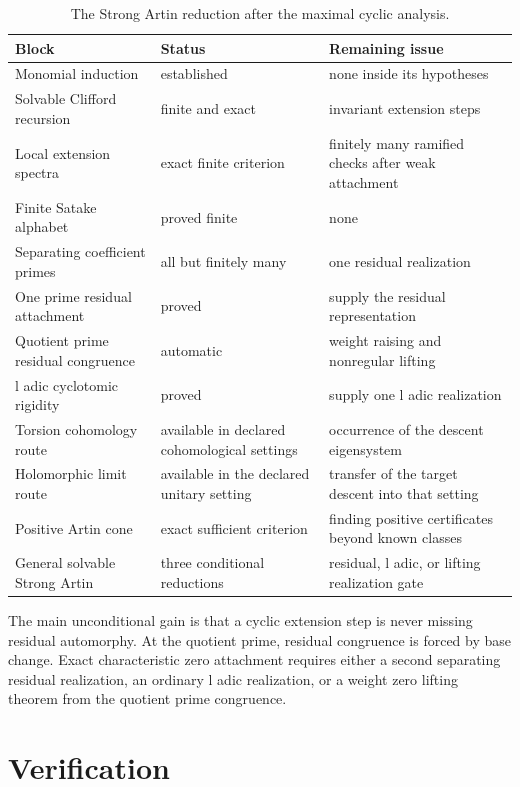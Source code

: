 \documentclass{aomart}
\theoremstyle{definition}
\theoremstyle{remark}
\begin{document}
\begin{table}[t]
\centering
\caption{The Strong Artin reduction after the maximal cyclic analysis.}
\label{tab:reduction_ledger}
\begin{tabular}{>{\raggedright\arraybackslash}p{}>{\raggedright\arraybackslash}p{}>{\raggedright\arraybackslash}p{}}
\toprule
Block & Status & Remaining issue\\
\midrule
Monomial induction & established & none inside its hypotheses\\
Solvable Clifford recursion & finite and exact & invariant extension steps\\
Local extension spectra & exact finite criterion & finitely many ramified checks after weak attachment\\
Finite Satake alphabet & proved finite & none\\
Separating coefficient primes & all but finitely many & one residual realization\\
One prime residual attachment & proved & supply the residual representation\\
Quotient prime residual congruence & automatic & weight raising and nonregular lifting\\
l adic cyclotomic rigidity & proved & supply one l adic realization\\
Torsion cohomology route & available in declared cohomological settings & occurrence of the descent eigensystem\\
Holomorphic limit route & available in the declared unitary setting & transfer of the target descent into that setting\\
Positive Artin cone & exact sufficient criterion & finding positive certificates beyond known classes\\
General solvable Strong Artin & three conditional reductions & residual, l adic, or lifting realization gate\\
\bottomrule
\end{tabular}
\end{table}

The main unconditional gain is that a cyclic extension step is never missing residual automorphy. At the quotient prime, residual congruence is forced by base change. Exact characteristic zero attachment requires either a second separating residual realization, an ordinary l adic realization, or a weight zero lifting theorem from the quotient prime congruence.

\section{Verification}\label{sec:verification}
\end{document}
